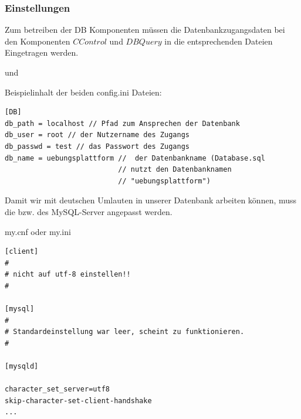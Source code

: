\subsubsection{Einstellungen}
Zum betreiben der DB Komponenten müssen die Datenbankzugangsdaten bei den Komponenten $CControl$ und $DBQuery$ in die entsprechenden  Dateien Eingetragen werden.

 und 

Beispielinhalt der beiden config.ini Dateien:

\begin{minipage}{\textwidth}
\begin{lstlisting}
[DB]
db_path = localhost // Pfad zum Ansprechen der Datenbank
db_user = root // der Nutzername des Zugangs
db_passwd = test // das Passwort des Zugangs
db_name = uebungsplattform //  der Datenbankname (Database.sql 
                           // nutzt den Datenbanknamen
                           // "uebungsplattform")
\end{lstlisting}
\end{minipage}

Damit wir mit deutschen Umlauten in unserer Datenbank arbeiten können, muss die  bzw.  des MySQL-Server angepasst werden.

\begin{minipage}{\textwidth}
my.cnf oder my.ini
\begin{lstlisting}
[client]
#
# nicht auf utf-8 einstellen!!
#

[mysql]
#
# Standardeinstellung war leer, scheint zu funktionieren.
#

[mysqld]

character_set_server=utf8
skip-character-set-client-handshake
...
\end{lstlisting}
\end{minipage}